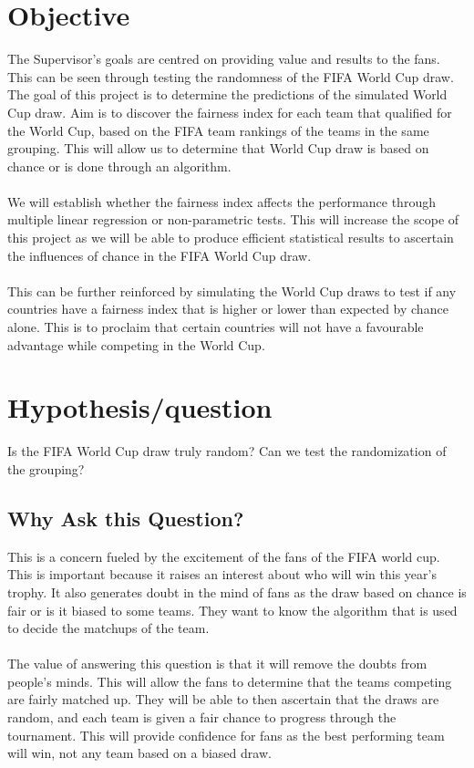 \documentclass[11pt,a4paper]{article}
\begin{document}
\section{Objective}


The Supervisor's goals are centred on providing value and results to the fans. This can be seen through testing the randomness of the FIFA World Cup draw. The goal of this project is to determine the predictions of the simulated World Cup draw. Aim is to discover the fairness index for each team that qualified for the World Cup, based on the FIFA team rankings of the teams in the same grouping. This will allow us to determine that World Cup draw is based on chance or is done through an algorithm.
\\ \\
We will establish whether the fairness index affects the performance through multiple linear regression or non-parametric tests. This will increase the scope of this project as we will be able to produce efficient statistical results to ascertain the influences of chance in the FIFA World Cup draw.
\\ \\
This can be further reinforced by simulating the World Cup draws to test if any countries have a fairness index that is higher or lower than expected by chance alone. This is to proclaim that certain countries will not have a favourable advantage while competing in the World Cup.


\section{Hypothesis/question}


Is the FIFA World Cup draw truly random? Can we test the randomization of the grouping?

\subsection{Why Ask this Question? }

This is a concern fueled by the excitement of the fans of the FIFA world cup. This is important because it raises an interest about who will win this year’s trophy. It also generates doubt in the mind of fans as the draw based on chance is fair or is it biased to some teams. They want to know the algorithm that is used to decide the matchups of the team.
\\ \\
The value of answering this question is that it will remove the doubts from people’s minds. This will allow the fans to determine that the teams competing are fairly matched up. They will be able to then ascertain that the draws are random, and each team is given a fair chance to progress through the tournament. This will provide confidence for fans as the best performing team will win, not any team based on a biased draw.
\end{document}

